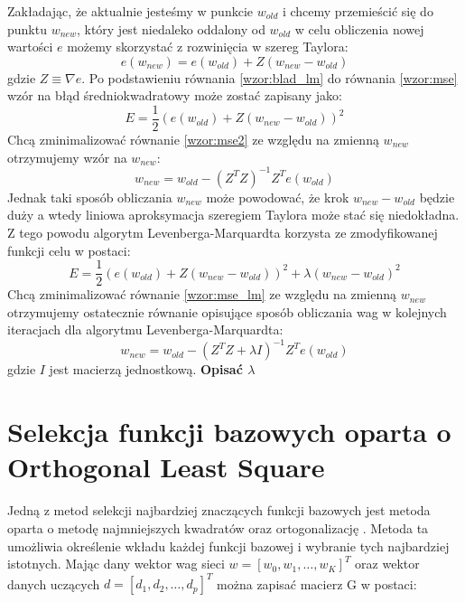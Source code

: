 Zakładając, że aktualnie jesteśmy w punkcie $w_{old}$ i chcemy przemieścić się do punktu $w_{new}$, który jest niedaleko oddalony od $w_{old}$ w celu obliczenia nowej wartości $e$ możemy skorzystać z rozwinięcia w szereg Taylora:
\begin{equation}
	\label{wzor:blad_lm}
	e(w_{new}) = e(w_{old}) + Z(w_{new} - w_{old})
\end{equation}
gdzie $Z \equiv \nabla e$. Po podstawieniu równania \ref{wzor:blad_lm} do równania \ref{wzor:mse} wzór na błąd średniokwadratowy może zostać zapisany jako:
\begin{equation}
	\label{wzor:mse2}
	E = \frac{1}{2}(e(w_{old}) + Z(w_{new} - w_{old}))^2
\end{equation}
Chcą zminimalizować równanie \ref{wzor:mse2} ze względu na zmienną $w_{new}$ otrzymujemy wzór na $w_{new}$:
\begin{equation}
	w_{new} = w_{old} - (Z^TZ)^{-1}Z^Te(w_{old})
\end{equation}
Jednak taki sposób obliczania $w_{new}$ może powodować, że krok $w_{new} - w_{old}$ będzie duży a wtedy liniowa aproksymacja szeregiem Taylora może stać się niedokładna. Z tego powodu algorytm Levenberga-Marquardta korzysta ze zmodyfikowanej funkcji celu w postaci:
\begin{equation}
	\label{wzor:mse_lm}
	E = \frac{1}{2}(e(w_{old}) + Z(w_{new} - w_{old}))^2 + \lambda (w_{new} - w_{old})^2
\end{equation}
Chcą zminimalizować równanie \ref{wzor:mse_lm} ze względu na zmienną $w_{new}$ otrzymujemy ostatecznie równanie opisujące sposób obliczania wag w kolejnych iteracjach dla algorytmu Levenberga-Marquardta:
\begin{equation}
	w_{new} = w_{old} -(Z^TZ + \lambda I)^{-1}Z^Te(w_{old})
\end{equation}
gdzie $I$ jest macierzą jednostkową. \textbf{Opisać $\lambda$}



\newpage
\section{Selekcja funkcji bazowych oparta o Orthogonal Least Square}
Jedną z metod selekcji najbardziej znaczących funkcji bazowych jest metoda oparta o metodę najmniejszych kwadratów oraz ortogonalizację \cite{Chen}. Metoda ta umożliwia określenie wkładu każdej funkcji bazowej i wybranie tych najbardziej istotnych. Mając dany wektor wag sieci $w = [w_0, w_1, \hdots, w_K]^T$ oraz wektor danych uczących $d = [d_1, d_2, \hdots, d_p]^T$ można zapisać macierz G w postaci:

